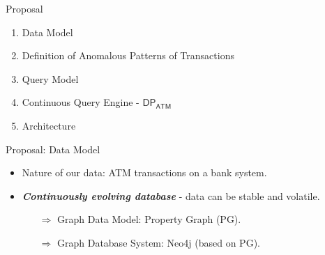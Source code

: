 
\begin{frame}{Proposal}

\begin{enumerate}
    \item Data Model
    \vspace{1em}
    \item Definition of Anomalous Patterns of Transactions
    \vspace{1em}
    \item Query Model
    \vspace{1em}
    \item Continuous Query Engine - $\mathsf{DP_{ATM}}$
    \vspace{1em}
    \item Architecture
\end{enumerate}
\end{frame}

\begin{frame}{Proposal: Data Model}

\begin{itemize}
\item Nature of our data: ATM transactions on a bank system.
\vspace{2em}
\pause
\item \textbf{\emph{Continuously evolving database}} - data can be stable and volatile.
\begin{itemize}
    \vspace{0.5em}
    \item[$\Rightarrow$] Graph Data Model: Property Graph (PG).
    \vspace{1em}
    \item[$\Rightarrow$] Graph Database System: Neo4j (based on PG).
\end{itemize}
\end{itemize}
\end{frame}


